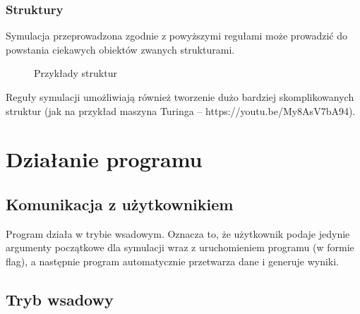 \documentclass{report}
\begin{document}
\subsection{Struktury}
Symulacja przeprowadzona zgodnie z powyższymi regułami może prowadzić do powstania ciekawych obiektów zwanych strukturami. 

\begin{figure}[h]
\centering
\setlength{\fboxsep}{0pt} %
\setlength{\fboxrule}{1pt} %
\caption{Przykłady struktur}
\end{figure}

Reguły symulacji umożliwiają również tworzenie dużo bardziej skomplikowanych struktur (jak na przykład maszyna Turinga -- https://youtu.be/My8AsV7bA94).



\chapter{Działanie programu}

\section{Komunikacja z użytkownikiem}
Program działa w trybie wsadowym. Oznacza to, że użytkownik podaje jedynie argumenty początkowe dla symulacji wraz z uruchomieniem programu (w formie flag), a następnie program automatycznie przetwarza dane i generuje wyniki.

\section{Tryb wsadowy}
\end{document}
